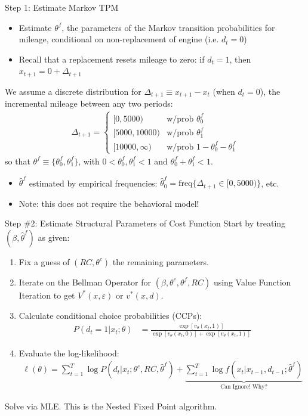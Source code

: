 \documentclass[aspectratio=169,11pt]{beamer}
\begin{document}
\begin{frame}{Step 1: Estimate Markov TPM}
\footnotesize
\begin{itemize}
\item Estimate $\theta^f$, the parameters of the Markov transition probabilities for mileage, conditional on non-replacement of engine (i.e. $d_t = 0$)
\item Recall that a replacement resets mileage to zero: if $d_t = 1$, then $x_{t+1} = 0 + \Delta_{t+1}$
\end{itemize}

We assume a discrete distribution for $\Delta_{t+1} \equiv x_{t+1} - x_t$ (when $d_t = 0$), the incremental mileage between any two periods:
\begin{align*}
\Delta_{t+1} = \left \{
\begin{matrix}
[0, 5000) & \text{w/prob } \theta^f_0 \\
[5000, 10000) & \text{w/prob } \theta^f_1 \\
[10000, \infty) & \text{w/prob } 1 - \theta^f_0 - \theta^f_1
\end{matrix}
\right .
\end{align*}
so that $\theta^f \equiv \{\theta^f_0, \theta^f_1 \}$, with $0 < \theta^f_0, \theta^f_1< 1$ and $\theta^f_0 + \theta^f_1 < 1$. \\
\vspace{2mm}
\begin{itemize}
\item $\hat \theta^f$ estimated by empirical frequencies: $\hat \theta^f_0 = \text{freq} \{ \Delta_{t+1} \in  [0, 5000) \}$, etc.
\item Note: this does not require the behavioral model!
\end{itemize}
\end{frame}

\begin{frame}{Step \#2: Estimate Structural Parameters of Cost Function}
\footnotesize
Start by treating $(\beta, \hat \theta^f)$ as given:
\begin{enumerate}
\item Fix a guess of $(RC,\theta^c)$ the remaining parameters.
\item Iterate on the Bellman Operator for $(\beta,\theta^c,\theta^f,RC)$ using \alert{Value Function Iteration} to get $V^*(x,\varepsilon)$ or $v^*(x,d)$.
\item Calculate \alert{conditional choice probabilities} (CCPs):
\begin{align*}
P(d_t=1 | x_t;\theta) &=  \frac {\exp[ v_{\theta} (x_t, 1)]  }{\exp[v_{\theta} (x_t, 0)] + \exp[ v_{\theta} (x_t, 1)]}
\end{align*}
\item Evaluate the log-likelihood:
\begin{align*}
\ell(\theta) = \sum^T_{t=1} \log P (d_t | x_t ; \theta^c,RC, \hat{\theta}^f) + \underbrace{\sum^T_{t=1} \log f (x_t | x_{t-1}, d_{t-1}; \hat{\theta}^f)}_{\text{Can Ignore! Why?}}
\end{align*}
\end{enumerate}
Solve via MLE. This is the \alert{Nested Fixed Point} algorithm.
\end{frame}
\end{document}
